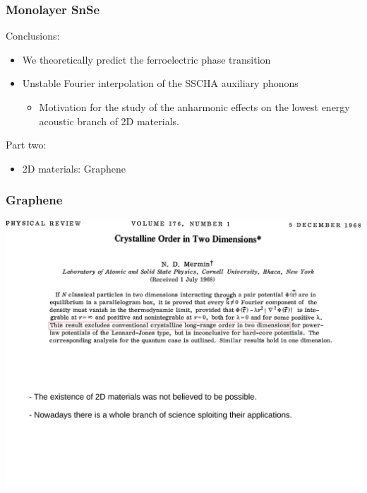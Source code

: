 \documentclass{beamer}
\begin{document}

\begin{frame}

\frametitle{Monolayer SnSe}
Conclusions:
\begin{itemize}
\item We theoretically predict the ferroelectric phase transition
\item Unstable Fourier interpolation of the SSCHA auxiliary phonons
\begin{itemize}
 \item Motivation for the study of the anharmonic effects on the lowest energy acoustic branch of 2D materials.
\end{itemize}
\end{itemize}

\end{frame}


\begin{frame}

Part two:
\begin{itemize}
\item 2D materials: Graphene 
\end{itemize}

\end{frame}


\begin{frame}

\frametitle{Graphene}
\vspace{0.5cm}
\begin{center}
 \includegraphics[width=0.85\linewidth]{Pictures/Graphene/mermin.pdf}
\end{center}

\end{frame}
\end{document}
